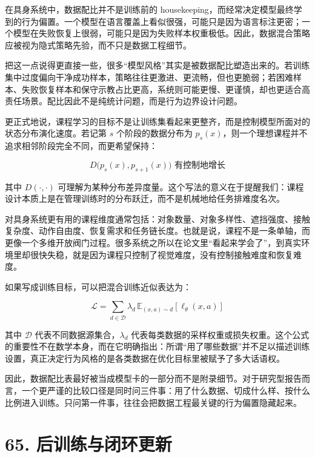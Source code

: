 在具身系统中，数据配比并不是训练前的 housekeeping，而经常决定模型最终学到的行为偏置。一个模型在语言覆盖上看似很强，可能只是因为语言标注更密；一个模型在失败恢复上很弱，可能只是因为失败样本权重极低。因此，数据混合策略应被视为隐式策略先验，而不只是数据工程细节。

把这一点说得更直接一些，很多“模型风格”其实是被数据配比塑造出来的。若训练集中过度偏向干净成功样本，策略往往更激进、更流畅，但也更脆弱；若困难样本、失败恢复样本和保守示教占比更高，系统则可能更慢、更谨慎，却也更适合高责任场景。配比因此不是纯统计问题，而是行为边界设计问题。

更正式地说，课程学习的目标不是让训练集看起来更整齐，而是控制模型所面对的状态分布演化速度。若记第 \(s\) 个阶段的数据分布为 \(p_s(x)\)，则一个理想课程并不追求相邻阶段完全不同，而更希望保持：

\begin{equation*}
D\bigl(p_s(x), p_{s+1}(x)\bigr) \text{ 有控制地增长}
\end{equation*}

其中 \(D(\cdot,\cdot)\) 可理解为某种分布差异度量。这个写法的意义在于提醒我们：课程设计本质上是在管理训练时的分布跃迁，而不是机械地给任务排难度名次。

对具身系统更有用的课程维度通常包括：对象数量、对象多样性、遮挡强度、接触复杂度、动作自由度、恢复需求和任务链长度。也就是说，课程不是一条单轴，而更像一个多维开放阀门过程。很多系统之所以在论文里“看起来学会了”，到真实环境里却很快失稳，就是因为课程只控制了视觉难度，没有控制接触难度和恢复难度。

如果写成训练目标，可以把混合训练近似表达为：

\begingroup
\scriptsize
\begin{equation*}
\mathcal{L} = \sum_{d \in \mathcal{D}} \lambda_d \, \mathbb{E}_{(x,a)\sim d}[\ell_\theta(x,a)]
\end{equation*}
\endgroup

其中 \(\mathcal{D}\) 代表不同数据源集合，\(\lambda_d\) 代表每类数据的采样权重或损失权重。这个公式的重要性不在数学本身，而在它明确指出：所谓“用了哪些数据”并不足以描述训练设置，真正决定行为风格的是各类数据在优化目标里被赋予了多大话语权。

因此，数据配比表最好被当成模型卡的一部分而不是附录细节。对于研究型报告而言，一个更严谨的比较口径是同时问三件事：用了什么数据、切成什么样、按什么比例进入训练。只问第一件事，往往会把数据工程最关键的行为偏置隐藏起来。

\section*{65. 后训练与闭环更新}

